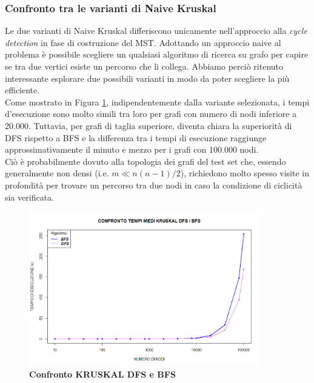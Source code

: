 \documentclass[]{article}
\begin{document}
\begin{flushleft}
\subsubsection{Confronto tra le varianti di Naive Kruskal}
Le due varianti di Naive Kruskal differiscono unicamente nell'approccio alla \textit{cycle detection} in fase di costruzione del MST. Adottando un approccio naive al problema è possibile scegliere un qualsiasi algoritmo di ricerca su grafo per capire se tra due vertici esiste un percorso che li collega. Abbiamo perciò ritenuto interessante esplorare due possibili varianti in modo da poter scegliere la più efficiente.\\
Come mostrato in Figura \ref{dfs-bfs}, indipendentemente dalla variante selezionata, i tempi d'esecuzione sono molto simili tra loro per grafi con numero di nodi inferiore a 20.000. Tuttavia, per grafi di taglia superiore, diventa chiara la superiorità di DFS rispetto a BFS e la differenza tra i tempi di esecuzione raggiunge approssimativamente il minuto e mezzo per i grafi con 100.000 nodi.\\
Ciò è probabilmente dovuto alla topologia dei grafi del test set che, essendo generalmente non densi (i.e. $m \ll n(n-1)/2$), richiedono molto spesso visite in profondità per trovare un percorso tra due nodi in caso la condizione di ciclicità sia verificata.
\begin{figure}[h]
	\centering
	\includegraphics[width=0.9\textwidth,height=\textheight,keepaspectratio]{COMPARE_2.png}
	\caption{\textbf{Confronto KRUSKAL DFS e BFS}}
	\label{dfs-bfs}
\end{figure}
\newpage

\end{flushleft}
\end{document}
